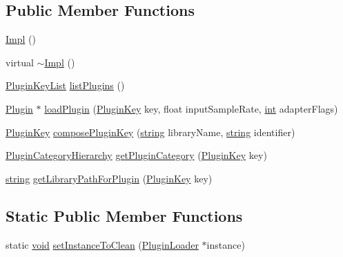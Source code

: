 \subsection*{Public Member Functions}
\begin{DoxyCompactItemize}
\item 
\hyperlink{class_vamp_1_1_host_ext_1_1_plugin_loader_1_1_impl_addac537272c2eb69973cbb942dc11deb}{Impl} ()
\item 
virtual \hyperlink{class_vamp_1_1_host_ext_1_1_plugin_loader_1_1_impl_a1e28874a14fafaf015404694da5fcfc8}{$\sim$\+Impl} ()
\item 
\hyperlink{class_vamp_1_1_host_ext_1_1_plugin_loader_a0d48b76e4f995110f53e0feeb23f733a}{Plugin\+Key\+List} \hyperlink{class_vamp_1_1_host_ext_1_1_plugin_loader_1_1_impl_a398ccb508176f5550b2b2ca05f1fa3eb}{list\+Plugins} ()
\item 
\hyperlink{class_vamp_1_1_plugin}{Plugin} $\ast$ \hyperlink{class_vamp_1_1_host_ext_1_1_plugin_loader_1_1_impl_a3f6c4872459007b13722818cbdac409c}{load\+Plugin} (\hyperlink{class_vamp_1_1_host_ext_1_1_plugin_loader_a473645bbb3ac5c1a0da2f0f482947c4d}{Plugin\+Key} key, float input\+Sample\+Rate, \hyperlink{xmltok_8h_a5a0d4a5641ce434f1d23533f2b2e6653}{int} adapter\+Flags)
\item 
\hyperlink{class_vamp_1_1_host_ext_1_1_plugin_loader_a473645bbb3ac5c1a0da2f0f482947c4d}{Plugin\+Key} \hyperlink{class_vamp_1_1_host_ext_1_1_plugin_loader_1_1_impl_ac84fafd9b12d44f8756628571b57d7ea}{compose\+Plugin\+Key} (\hyperlink{test__lib_f_l_a_c_2format_8c_ab02026ad0de9fb6c1b4233deb0a00c75}{string} library\+Name, \hyperlink{test__lib_f_l_a_c_2format_8c_ab02026ad0de9fb6c1b4233deb0a00c75}{string} identifier)
\item 
\hyperlink{class_vamp_1_1_host_ext_1_1_plugin_loader_ad6a39aa0c79d8d9209eb0b8dfe9d1364}{Plugin\+Category\+Hierarchy} \hyperlink{class_vamp_1_1_host_ext_1_1_plugin_loader_1_1_impl_ade4a5a8acbd85537c99440c4ac974be4}{get\+Plugin\+Category} (\hyperlink{class_vamp_1_1_host_ext_1_1_plugin_loader_a473645bbb3ac5c1a0da2f0f482947c4d}{Plugin\+Key} key)
\item 
\hyperlink{test__lib_f_l_a_c_2format_8c_ab02026ad0de9fb6c1b4233deb0a00c75}{string} \hyperlink{class_vamp_1_1_host_ext_1_1_plugin_loader_1_1_impl_aaac3ed8bf770f0675e624d411dab3efb}{get\+Library\+Path\+For\+Plugin} (\hyperlink{class_vamp_1_1_host_ext_1_1_plugin_loader_a473645bbb3ac5c1a0da2f0f482947c4d}{Plugin\+Key} key)
\end{DoxyCompactItemize}
\subsection*{Static Public Member Functions}
\begin{DoxyCompactItemize}
\item 
static \hyperlink{sound_8c_ae35f5844602719cf66324f4de2a658b3}{void} \hyperlink{class_vamp_1_1_host_ext_1_1_plugin_loader_1_1_impl_ab7147ecb2186a715b0f7e83ba70f0946}{set\+Instance\+To\+Clean} (\hyperlink{class_vamp_1_1_host_ext_1_1_plugin_loader}{Plugin\+Loader} $\ast$instance)
\end{DoxyCompactItemize}
